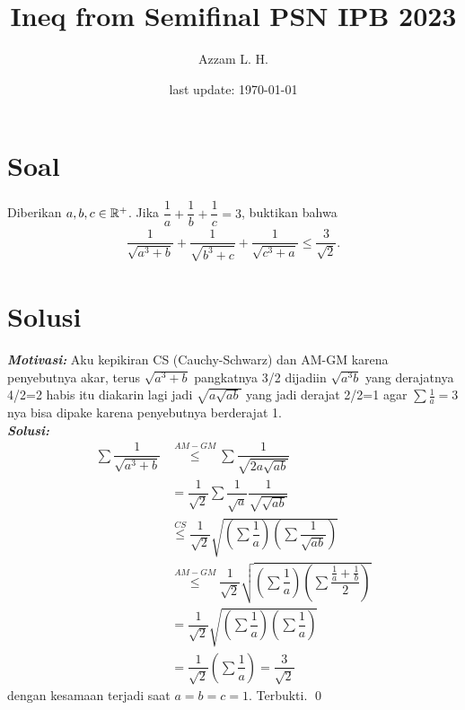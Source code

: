 \documentclass[12pt]{scrartcl}
\title{Ineq from Semifinal PSN IPB 2023}
\author{Azzam L. H.}
\date{last update: \today}
\begin{document}
\maketitle
\pagestyle{plain}
\section{Soal}
Diberikan $a,b,c \in \mathbb R^+$. Jika $\dfrac{1}{a}+\dfrac{1}{b}+\dfrac{1}{c}=3$, buktikan bahwa
\begin{align*}
    \dfrac{1}{\sqrt{a^3+b}}+\dfrac{1}{\sqrt{b^3+c}}+\dfrac{1}{\sqrt{c^3+a}} \le \dfrac{3}{\sqrt{2}}.
\end{align*}

\newpage
\section{Solusi}
\textit{\textbf{Motivasi: }} Aku kepikiran CS (Cauchy-Schwarz) dan AM-GM karena penyebutnya akar, terus $\sqrt{a^3+b}$ pangkatnya 3/2 dijadiin $\sqrt{a^3b}$  yang derajatnya 4/2=2 habis itu diakarin lagi jadi $\sqrt{a\sqrt{ab}}$ yang jadi derajat 2/2=1 agar $\sum \frac{1}{a} = 3$ nya bisa dipake karena penyebutnya berderajat 1.\\
\textit{\textbf{Solusi:}}
\begin{align*}
    \sum \dfrac{1}{\sqrt{a^3+b}}
    &\overset{AM-GM}{\le}
    \sum\dfrac{1}{\sqrt{2a\sqrt{ab}}}\\
    &=
    \dfrac{1}{\sqrt{2}}\sum\dfrac{1}{\sqrt{a}}\dfrac{1}{\sqrt{\sqrt{{ab}}}}\\
    &\overset{CS}{\le}
    \dfrac{1}{\sqrt{2}}\sqrt{\left(\sum\dfrac{1}{a}\right)\left(\sum\dfrac{1}{\sqrt{ab}}\right)}\\
    &\overset{AM-GM}{\le}
    \dfrac{1}{\sqrt{2}}\sqrt{\left(\sum\dfrac{1}{a}\right)\left(\sum\dfrac{\frac{1}{a}+\frac{1}{b}}{2}\right)}\\
    &=
    \dfrac{1}{\sqrt{2}}\sqrt{\left(\sum\dfrac{1}{a}\right)\left(\sum\dfrac{1}{a}\right)}\\
    &=
    \dfrac{1}{\sqrt{2}}\left(\sum\dfrac{1}{a}\right)
    =
    \dfrac{3}{\sqrt{2}}
\end{align*}
dengan kesamaan terjadi saat $a=b=c=1$. Terbukti. \qed
\end{document}
